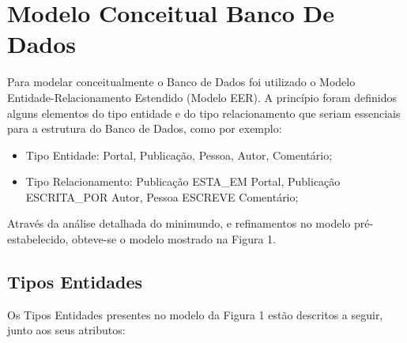 \section{Modelo Conceitual Banco De Dados}

Para modelar conceitualmente o Banco de Dados foi utilizado o Modelo Entidade-Relacionamento Estendido (Modelo EER). A princípio foram definidos alguns elementos do tipo entidade e do tipo relacionamento que seriam essenciais para a estrutura do Banco de Dados, como por exemplo:

\begin{itemize}
				\item Tipo Entidade: Portal, Publicação, Pessoa, Autor, Comentário; 

				\item  Tipo Relacionamento: Publicação ESTA\_EM Portal, Publicação ESCRITA\_POR Autor, Pessoa ESCREVE Comentário;
\end{itemize}

Através da análise detalhada do minimundo, e refinamentos no modelo pré-estabelecido, obteve-se o modelo mostrado na Figura 1.


\subsection{Tipos Entidades}

Os Tipos Entidades presentes no modelo da Figura 1 estão descritos a seguir, junto aos seus atributos:

